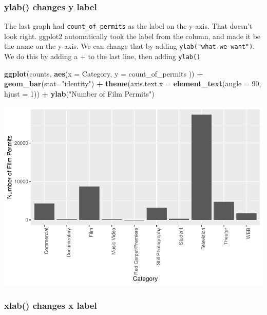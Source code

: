 \documentclass[]{book}
\newenvironment{Shaded}{\begin{snugshade}}{\end{snugshade}}
\newcommand{\KeywordTok}[1]{\textcolor[rgb]{0.13,0.29,0.53}{\textbf{#1}}}
\newcommand{\DataTypeTok}[1]{\textcolor[rgb]{0.13,0.29,0.53}{#1}}
\newcommand{\DecValTok}[1]{\textcolor[rgb]{0.00,0.00,0.81}{#1}}
\newcommand{\StringTok}[1]{\textcolor[rgb]{0.31,0.60,0.02}{#1}}
\newcommand{\OperatorTok}[1]{\textcolor[rgb]{0.81,0.36,0.00}{\textbf{#1}}}
\newcommand{\NormalTok}[1]{#1}
\begin{document}
\subsubsection{ylab() changes y label}\label{ylab-changes-y-label}

The last graph had \texttt{count\_of\_permits} as the label on the
y-axis. That doesn't look right. ggplot2 automatically took the label
from the column, and made it be the name on the y-axis. We can change
that by adding \texttt{ylab("what\ we\ want")}. We do this by adding a
\(+\) to the last line, then adding \texttt{ylab()}

\begin{Shaded}
\begin{Highlighting}[]
\KeywordTok{ggplot}\NormalTok{(counts, }\KeywordTok{aes}\NormalTok{(}\DataTypeTok{x =}\NormalTok{ Category, }\DataTypeTok{y =}\NormalTok{ count_of_permits )) }\OperatorTok{+}
\StringTok{  }\KeywordTok{geom_bar}\NormalTok{(}\DataTypeTok{stat=}\StringTok{"identity"}\NormalTok{) }\OperatorTok{+}\StringTok{ }
\StringTok{  }\KeywordTok{theme}\NormalTok{(}\DataTypeTok{axis.text.x =} \KeywordTok{element_text}\NormalTok{(}\DataTypeTok{angle =} \DecValTok{90}\NormalTok{, }\DataTypeTok{hjust =} \DecValTok{1}\NormalTok{)) }\OperatorTok{+}
\StringTok{  }\KeywordTok{ylab}\NormalTok{(}\StringTok{"Number of Film Permits"}\NormalTok{)}
\end{Highlighting}
\end{Shaded}

\includegraphics{Statistics_Lab_files/figure-latex/1categoryC-1.pdf}

\subsubsection{xlab() changes x label}\label{xlab-changes-x-label}
\end{document}
